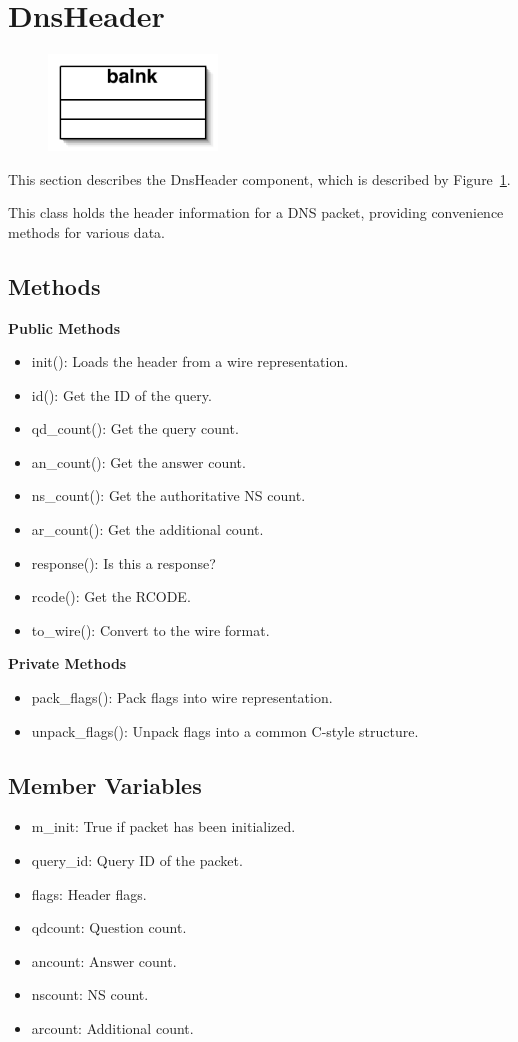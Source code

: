 \section{DnsHeader}\label{sec:dnshdr}

\begin{figure}
\begin{center}
\includegraphics[width=0.4\textwidth]{figs/blank}
\end{center}
\caption{}
\label{fig:dnshdr}
\end{figure}

This section describes the DnsHeader component, which is described by Figure~\ref{fig:dnshdr}.  

This class holds the header information for a DNS packet, providing convenience methods for various data.

\subsection{Methods}

{\bf Public Methods}
\begin{itemize}
\item init(): Loads the header from a wire representation.
\item id(): Get the ID of the query.
\item qd\_count(): Get the query count.
\item an\_count(): Get the answer count.
\item ns\_count(): Get the authoritative NS count.
\item ar\_count(): Get the additional count.
\item response(): Is this a response?
\item rcode(): Get the RCODE.
\item to\_wire(): Convert to the wire format.
\end{itemize}

{\bf Private Methods}
\begin{itemize}
\item pack\_flags(): Pack flags into wire representation.
\item unpack\_flags(): Unpack flags into a common C-style structure.
\end{itemize}

\subsection{Member Variables}
\begin{itemize}
\item m\_init: True if packet has been initialized.
\item query\_id: Query ID of the packet.
\item flags: Header flags.
\item qdcount: Question count.
\item ancount: Answer count.
\item nscount: NS count.
\item arcount: Additional count.
\end{itemize}
